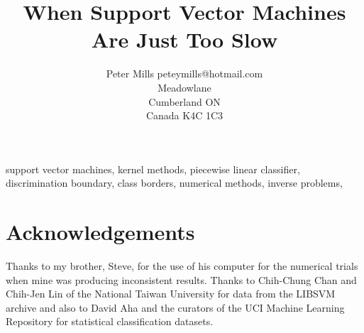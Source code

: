 \documentclass[twoside,11pt]{article}
\begin{document}
\title{When Support Vector Machines Are Just Too Slow}

\author{\name Peter Mills
	\email peteymills@hotmail.com \\
        Meadowlane\\
       Cumberland ON\\
       Canada K4C 1C3}


\maketitle

\begin{abstract}%
	
\end{abstract}

\begin{keywords}
support vector machines,
kernel methods,
piecewise linear classifier, 
discrimination boundary,
class borders,
numerical methods, 
inverse problems,
\end{keywords}



\newpage

\appendix



\section*{Acknowledgements}

Thanks to my brother, Steve, for the use of his computer for the numerical
trials when mine was producing inconsistent results.
Thanks to Chih-Chung Chan and Chih-Jen Lin of the National Taiwan University
for data from the LIBSVM archive and also to David Aha and the curators of
the UCI Machine Learning Repository for statistical classification datasets.

\vskip 0.2in

\end{document}
